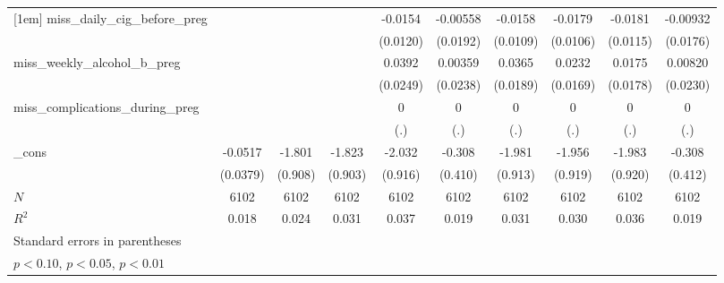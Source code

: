 \begin{table}[htbp]
\begin{tabular}{l*{9}{c}}
[1em]
miss\_daily\_cig\_before\_preg&                     &                     &                     &     -0.0154         &    -0.00558         &     -0.0158         &     -0.0179\sym{*}  &     -0.0181         &    -0.00932         \\
            &                     &                     &                     &    (0.0120)         &    (0.0192)         &    (0.0109)         &    (0.0106)         &    (0.0115)         &    (0.0176)         \\
[1em]
miss\_weekly\_alcohol\_b\_preg&                     &                     &                     &      0.0392         &     0.00359         &      0.0365\sym{*}  &      0.0232         &      0.0175         &     0.00820         \\
            &                     &                     &                     &    (0.0249)         &    (0.0238)         &    (0.0189)         &    (0.0169)         &    (0.0178)         &    (0.0230)         \\
[1em]
miss\_complications\_during\_preg&                     &                     &                     &           0         &           0         &           0         &           0         &           0         &           0         \\
            &                     &                     &                     &         (.)         &         (.)         &         (.)         &         (.)         &         (.)         &         (.)         \\
[1em]
\_cons      &     -0.0517         &      -1.801\sym{**} &      -1.823\sym{**} &      -2.032\sym{**} &      -0.308         &      -1.981\sym{**} &      -1.956\sym{**} &      -1.983\sym{**} &      -0.308         \\
            &    (0.0379)         &     (0.908)         &     (0.903)         &     (0.916)         &     (0.410)         &     (0.913)         &     (0.919)         &     (0.920)         &     (0.412)         \\
\hline
\(N\)       &        6102         &        6102         &        6102         &        6102         &        6102         &        6102         &        6102         &        6102         &        6102         \\
\(R^{2}\)   &       0.018         &       0.024         &       0.031         &       0.037         &       0.019         &       0.031         &       0.030         &       0.036         &       0.019         \\
\hline\hline
\multicolumn{10}{l}{\footnotesize Standard errors in parentheses}\\
\multicolumn{10}{l}{\footnotesize \sym{*} \(p<0.10\), \sym{**} \(p<0.05\), \sym{***} \(p<0.01\)}\\
\end{tabular}
\end{table}
